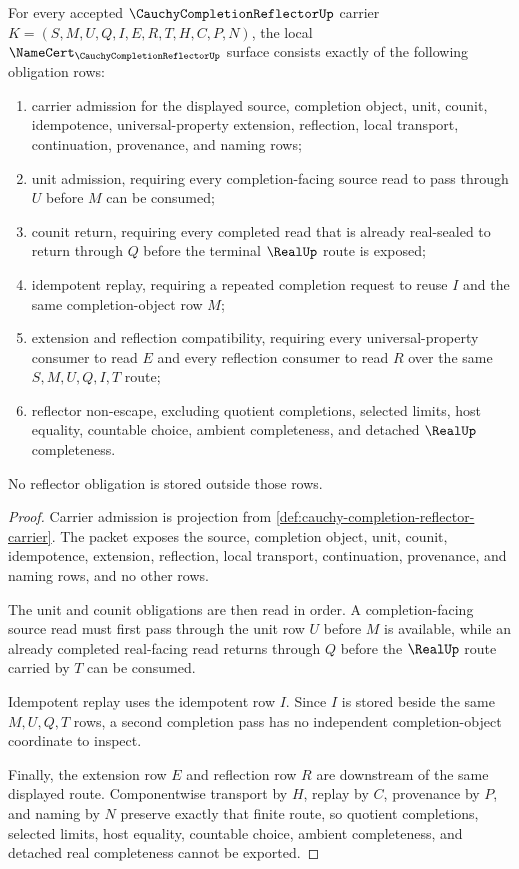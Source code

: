 \begin{theorem}
\label{thm:cauchy-completion-reflector-namecert-obligations}
For every accepted $\CauchyCompletionReflectorUp$ carrier $K=(S,M,U,Q,I,E,R,T,H,C,P,N)$, the local $\NameCert_{\CauchyCompletionReflectorUp}$ surface consists exactly of the following obligation rows:
\begin{enumerate}
\item carrier admission for the displayed source, completion object, unit, counit, idempotence, universal-property extension, reflection, local transport, continuation, provenance, and naming rows;
\item unit admission, requiring every completion-facing source read to pass through $U$ before $M$ can be consumed;
\item counit return, requiring every completed read that is already real-sealed to return through $Q$ before the terminal $\RealUp$ route is exposed;
\item idempotent replay, requiring a repeated completion request to reuse $I$ and the same completion-object row $M$;
\item extension and reflection compatibility, requiring every universal-property consumer to read $E$ and every reflection consumer to read $R$ over the same $S,M,U,Q,I,T$ route;
\item reflector non-escape, excluding quotient completions, selected limits, host equality, countable choice, ambient completeness, and detached $\RealUp$ completeness.
\end{enumerate}
No reflector obligation is stored outside those rows.
\end{theorem}
\begin{proof}
Carrier admission is projection from \autoref{def:cauchy-completion-reflector-carrier}. The packet exposes the source, completion object, unit, counit, idempotence, extension, reflection, local transport, continuation, provenance, and naming rows, and no other rows.

The unit and counit obligations are then read in order. A completion-facing source read must first pass through the unit row $U$ before $M$ is available, while an already completed real-facing read returns through $Q$ before the $\RealUp$ route carried by $T$ can be consumed.

Idempotent replay uses the idempotent row $I$. Since $I$ is stored beside the same $M,U,Q,T$ rows, a second completion pass has no independent completion-object coordinate to inspect.

Finally, the extension row $E$ and reflection row $R$ are downstream of the same displayed route. Componentwise transport by $H$, replay by $C$, provenance by $P$, and naming by $N$ preserve exactly that finite route, so quotient completions, selected limits, host equality, countable choice, ambient completeness, and detached real completeness cannot be exported.
\end{proof}

